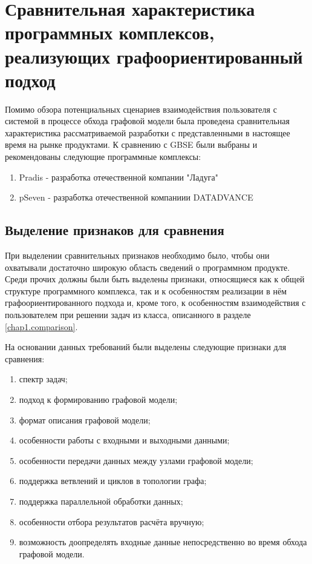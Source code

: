 \chapter{Сравнительная характеристика программных комплексов, реализующих графоориентированный подход}
Помимо обзора потенциальных сценариев взаимодействия пользователя с системой в процессе обхода графовой модели была проведена сравнительная характеристика рассматриваемой разработки с представленными в настоящее время на рынке продуктами.
К сравнению с GBSE были выбраны и рекомендованы следующие программные комплексы:
\begin{enumerate}
    \item Pradis - разработка отечественной компании "Ладуга"
    \item pSeven - разработка отечественной компаниии DATADVANCE
\end{enumerate}

\section{Выделение признаков для сравнения}
При выделении сравнительных признаков необходимо было, чтобы они охватывали достаточно широкую область сведений о программном продукте. Среди прочих должны были быть выделены признаки, относящиеся как к общей структуре программного комплекса, так и к особенностям реализации в нём графоориентированного подхода и, кроме того, к особенностям взаимодействия с пользователем при решении задач из класса, описанного в разделе \ref{chap1.comparison}.

На основании данных требований были выделены следующие признаки для сравнения:
\begin{enumerate}
    \item спектр задач;
    \item подход к формированию графовой модели;
    \item формат описания графовой модели;
    \item особенности работы с входными и выходными данными;
    \item особенности передачи данных между узлами графовой модели;
    \item поддержка ветвлений и циклов в топологии графа;
    \item поддержка параллельной обработки данных;
    \item особенности отбора результатов расчёта вручную;
    \item возможность доопределять входные данные непосредственно во время обхода графовой модели.
\end{enumerate}

